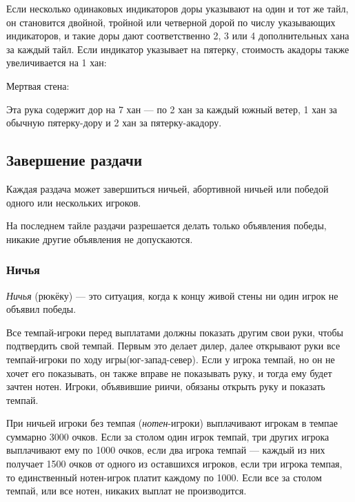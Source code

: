 Если несколько одинаковых индикаторов доры указывают на один и тот же тайл, он становится двойной, тройной или четверной дорой по числу указывающих индикаторов, и такие доры дают соответственно 2, 3 или 4 дополнительных хана за каждый тайл. Если индикатор указывает на пятерку, стоимость акадоры также увеличивается на 1 хан:

\begin{additional}
	
	
	Мертвая стена:
	
	Эта рука содержит дор на 7 хан --- по 2 хан за каждый южный ветер, 1 хан за обычную пятерку-дору и 2 хан за пятерку-акадору.
	
\end{additional}

\subsection{Завершение раздачи}
Каждая раздача может завершиться ничьей, абортивной ничьей или победой одного или нескольких игроков. 

На последнем тайле раздачи разрешается делать только объявления победы, никакие другие объявления не допускаются.

\subsubsection{Ничья}

\textit{Ничья} (рюкёку) --- это ситуация, когда к концу живой стены ни один игрок не объявил победы. 

Все темпай-игроки перед выплатами должны показать другим свои руки, чтобы подтвердить свой темпай. Первым это делает дилер, далее открывают руки все темпай-игроки по ходу игры(юг-запад-север). Если у игрока темпай, но он не хочет его показывать, он также вправе не показывать руку, и тогда ему будет зачтен нотен. Игроки, объявившие риичи, обязаны открыть руку и показать темпай.

При ничьей игроки без темпая (\textit{нотен}-игроки) выплачивают игрокам в темпае суммарно 3000 очков. Если за столом один игрок темпай, три других игрока выплачивают ему по 1000 очков, если два игрока темпай --- каждый из них получает 1500 очков от одного из оставшихся игроков, если три игрока темпая, то единственный нотен-игрок платит каждому по 1000. Если все за столом темпай, или все нотен, никаких выплат не производится.

